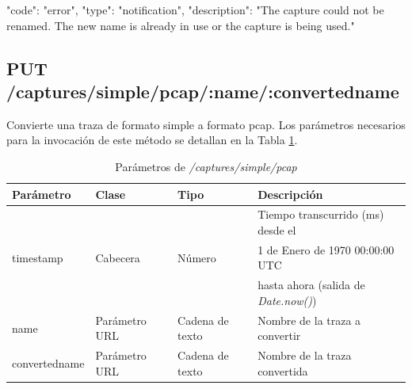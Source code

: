 \begin{itemize}
{\begin{minipage}{\textwidth}
\begin{code}[language=json]
{
  "code": "error",
  "type": "notification",
  "description": "The capture could not be renamed. The new name is already in use or the capture is being used."
}
\end{code}
\end{minipage}
}
\end{itemize}

%
%
\subsection{PUT /captures/simple/pcap/:name/:convertedname}
Convierte una \gls{traza} de formato \gls{simple} a formato \gls{pcap}. Los parámetros necesarios para la invocación de este método se detallan en la Tabla \ref{extra:api:capturessimplepcap:invocacion}.

\begin{table}[H]
\centering
\begin{tabular}{|l|l|l|l|}
\hline
\rowcolor[HTML]{F5F5F5}
\textbf{Parámetro}  & \textbf{Clase} & \textbf{Tipo}   & \textbf{Descripción}                        \\ \hline
                    &                &                 & Tiempo transcurrido (ms) desde el           \\
timestamp           & Cabecera       & Número          & 1 de Enero de 1970 00:00:00 UTC             \\
                    &                &                 & hasta ahora (salida de \textit{Date.now()}) \\ \hline
name                & Parámetro URL  & Cadena de texto & Nombre de la \gls{traza} a convertir        \\ \hline
convertedname       & Parámetro URL  & Cadena de texto & Nombre de la \gls{traza} convertida         \\ \hline
\end{tabular}
\caption{Parámetros de \textit{/captures/simple/pcap}}
\label{extra:api:capturessimplepcap:invocacion}
\end{table}

